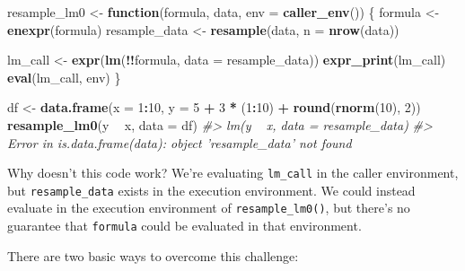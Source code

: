 \documentclass[]{book}
\newenvironment{Shaded}{\begin{snugshade}}{\end{snugshade}}
\newcommand{\CommentTok}[1]{\textcolor[rgb]{0.37,0.37,0.37}{\textit{#1}}}
\newcommand{\ControlFlowTok}[1]{\textcolor[rgb]{0.27,0.27,0.27}{\textbf{#1}}}
\newcommand{\DataTypeTok}[1]{\textcolor[rgb]{0.27,0.27,0.27}{#1}}
\newcommand{\DecValTok}[1]{\textcolor[rgb]{0.06,0.06,0.06}{#1}}
\newcommand{\KeywordTok}[1]{\textcolor[rgb]{0.27,0.27,0.27}{\textbf{#1}}}
\newcommand{\NormalTok}[1]{#1}
\newcommand{\OperatorTok}[1]{\textcolor[rgb]{0.43,0.43,0.43}{\textbf{#1}}}
\newcommand{\StringTok}[1]{\textcolor[rgb]{0.5,0.5,0.5}{#1}}
\begin{document}
\begin{Shaded}
\begin{Highlighting}[]
\NormalTok{resample_lm0 <-}\StringTok{ }\ControlFlowTok{function}\NormalTok{(formula, data, }\DataTypeTok{env =} \KeywordTok{caller_env}\NormalTok{()) \{}
\NormalTok{  formula <-}\StringTok{ }\KeywordTok{enexpr}\NormalTok{(formula)}
\NormalTok{  resample_data <-}\StringTok{ }\KeywordTok{resample}\NormalTok{(data, }\DataTypeTok{n =} \KeywordTok{nrow}\NormalTok{(data))}

\NormalTok{  lm_call <-}\StringTok{ }\KeywordTok{expr}\NormalTok{(}\KeywordTok{lm}\NormalTok{(}\OperatorTok{!!}\NormalTok{formula, }\DataTypeTok{data =}\NormalTok{ resample_data))}
  \KeywordTok{expr_print}\NormalTok{(lm_call)}
  \KeywordTok{eval}\NormalTok{(lm_call, env)}
\NormalTok{\}}

\NormalTok{df <-}\StringTok{ }\KeywordTok{data.frame}\NormalTok{(}\DataTypeTok{x =} \DecValTok{1}\OperatorTok{:}\DecValTok{10}\NormalTok{, }\DataTypeTok{y =} \DecValTok{5} \OperatorTok{+}\StringTok{ }\DecValTok{3} \OperatorTok{*}\StringTok{ }\NormalTok{(}\DecValTok{1}\OperatorTok{:}\DecValTok{10}\NormalTok{) }\OperatorTok{+}\StringTok{ }\KeywordTok{round}\NormalTok{(}\KeywordTok{rnorm}\NormalTok{(}\DecValTok{10}\NormalTok{), }\DecValTok{2}\NormalTok{))}
\KeywordTok{resample_lm0}\NormalTok{(y }\OperatorTok{~}\StringTok{ }\NormalTok{x, }\DataTypeTok{data =}\NormalTok{ df)}
\CommentTok{#> lm(y ~ x, data = resample_data)}
\CommentTok{#> Error in is.data.frame(data): object 'resample_data' not found}
\end{Highlighting}
\end{Shaded}

Why doesn't this code work? We're evaluating \texttt{lm\_call} in the caller environment, but \texttt{resample\_data} exists in the execution environment. We could instead evaluate in the execution environment of \texttt{resample\_lm0()}, but there's no guarantee that \texttt{formula} could be evaluated in that environment.

There are two basic ways to overcome this challenge:
\end{document}
